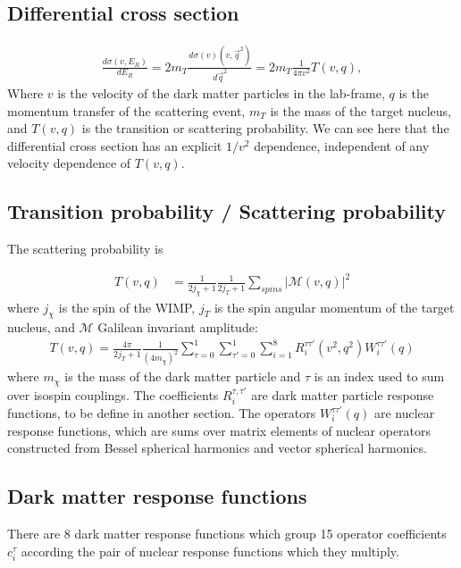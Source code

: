 \documentclass[11pt]{amsart}
\begin{document}
\subsection{Differential cross section}\label{crosssection}
\begin{equation}
\begin{split}
\frac{d\sigma(v,E_R)}{dE_R} = 2m_T \frac{d\sigma(v)(v,\vec{q}^2)}{d\vec{q}^2} = 2m_T\frac{1}{4\pi v^2}T(v,q),
\end{split}
\end{equation}
Where $v$ is the velocity of the dark matter particles in the lab-frame, $q$ is the momentum transfer of the scattering event, $m_T$ is the mass of the target nucleus, and $T(v,q)$ is the transition or scattering probability. We can see here that the differential cross section has an explicit $1/v^2$ dependence, independent of any velocity dependence of $T(v,q)$.


\subsection{Transition probability / Scattering probability}

The scattering probability is

\begin{equation}
\begin{split}
T(v,q) &= \frac{1}{2j_\chi+1}\frac{1}{2j_T+1}\sum_{spins}|\mathcal{M}(v,q)|^2 
\end{split}
\end{equation}
where $j_\chi$ is the spin of the WIMP, $j_T$ is the spin angular momentum of the target nucleus, and $\mathcal{M}$ Galilean invariant amplitude:
\begin{align}
	T(v,q) = \frac{4\pi}{2j_T+1}\frac{1}{(4m_\chi)^2}
		\sum_{\tau=0}^1\sum_{\tau'=0}^1\sum_{i=1}^8 R_i^{\tau\tau'}(v^2,q^2)
		W_i^{\tau\tau'}(q)
\end{align}
where $m_\chi$ is the mass of the dark matter particle and $\tau$ is an index used to sum over isospin couplings. The coefficients $R_i^{\tau,\tau'}$ are dark matter particle response functions, to be define in another section. The operators $W_i^{\tau\tau'}(q)$ are nuclear response functions, which are sums over matrix elements of nuclear operators constructed from Bessel spherical harmonics and vector spherical harmonics.
\subsection{Dark matter response functions}
There are 8 dark matter response functions which group 15 operator coefficients $c_i^\tau$ according the pair of nuclear response functions which they multiply.
\end{document}
